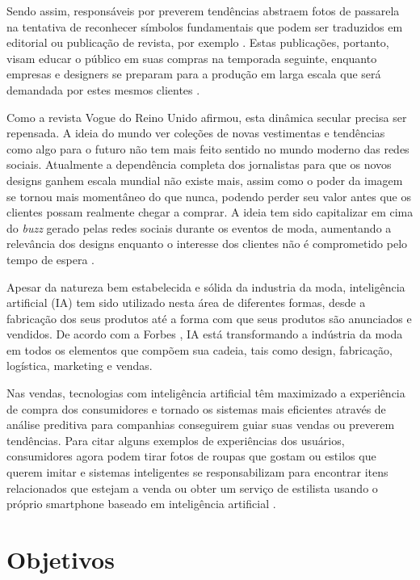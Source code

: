 \documentclass[12pt]{report}
\begin{document}
Sendo assim, responsáveis por preverem tendências abstraem fotos de passarela na tentativa de reconhecer símbolos fundamentais que podem ser traduzidos em editorial ou publicação de revista, por exemplo \cite{jia}. Estas publicações, portanto, visam educar o público em suas compras na temporada seguinte, enquanto empresas e designers se preparam para a produção em larga escala que será demandada por estes mesmos clientes \cite{FASHIONJOURNALISM}. 

Como a revista Vogue do Reino Unido afirmou, esta dinâmica secular precisa ser repensada. A ideia do mundo ver coleções de novas vestimentas e tendências como algo para o futuro não tem mais feito sentido no mundo moderno das redes sociais. Atualmente a dependência completa dos jornalistas para que os novos designs ganhem escala mundial não existe mais, assim como o poder da imagem se tornou mais momentâneo do que nunca, podendo perder seu valor antes que os clientes possam realmente chegar a comprar. A ideia tem sido capitalizar em cima do \textit{buzz} gerado pelas redes sociais durante os eventos de moda, aumentando a relevância dos designs enquanto o interesse dos clientes não é comprometido pelo tempo de espera \cite{VOGUEUK}.   

Apesar da natureza bem estabelecida e sólida da industria da moda, inteligência artificial (\ac{IA}) tem sido utilizado nesta área de diferentes formas, desde a fabricação dos seus produtos até a forma com que seus produtos são anunciados e vendidos. De acordo com a Forbes \cite{Forbes}, \ac{IA} está transformando a indústria da moda em todos os elementos que compõem sua cadeia, tais como design, fabricação, logística, marketing e vendas.

Nas vendas, tecnologias com inteligência artificial têm maximizado a experiência de compra dos consumidores e tornado os sistemas mais eficientes através de análise preditiva para companhias conseguirem guiar suas vendas ou preverem tendências. Para citar alguns exemplos de experiências dos usuários, consumidores agora podem tirar fotos de roupas que gostam ou estilos que querem imitar e sistemas inteligentes se responsabilizam para encontrar itens relacionados que estejam a venda ou obter um serviço de estilista usando o próprio smartphone baseado em inteligência artificial \cite{Forbes}.

\section{Objetivos}
\end{document}
